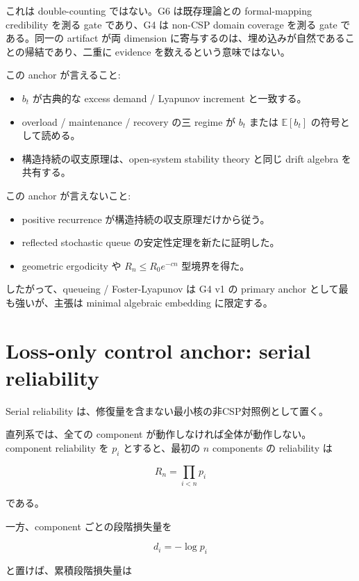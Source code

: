 \documentclass[12pt,a4paper]{article}
\begin{document}
これは double-counting ではない。G6 は既存理論との formal-mapping credibility を測る gate であり、G4 は non-CSP domain coverage を測る gate である。同一の artifact が両 dimension に寄与するのは、埋め込みが自然であることの帰結であり、二重に evidence を数えるという意味ではない。

この anchor が言えること:

\begin{itemize}
\tightlist
\item
  \(b_{t}\) が古典的な excess demand / Lyapunov increment と一致する。
\item
  overload / maintenance / recovery の三 regime が \(b_{t}\) または \(\mathbb E[b_{t}]\) の符号として読める。
\item
  構造持続の収支原理は、open-system stability theory と同じ drift algebra を共有する。
\end{itemize}

この anchor が言えないこと:

\begin{itemize}
\tightlist
\item
  positive recurrence が構造持続の収支原理だけから従う。
\item
  reflected stochastic queue の安定性定理を新たに証明した。
\item
  geometric ergodicity や \(R_{n}\le R_0e^{-cn}\) 型境界を得た。
\end{itemize}

したがって、queueing / Foster-Lyapunov は G4 v1 の primary anchor として最も強いが、主張は minimal algebraic embedding に限定する。

\section{Loss-only control anchor: serial reliability}\label{loss-only-control-anchor-serial-reliability}

Serial reliability は、修復量を含まない最小核の非CSP対照例として置く。

直列系では、全ての component が動作しなければ全体が動作しない。component reliability を \(p_{i}\) とすると、最初の \(n\) components の reliability は

\[
R_{n}=\prod_{i<n}p_{i}
\]

である。

一方、component ごとの段階損失量を

\[
d_{i}=-\log p_{i}
\]

と置けば、累積段階損失量は
\end{document}
